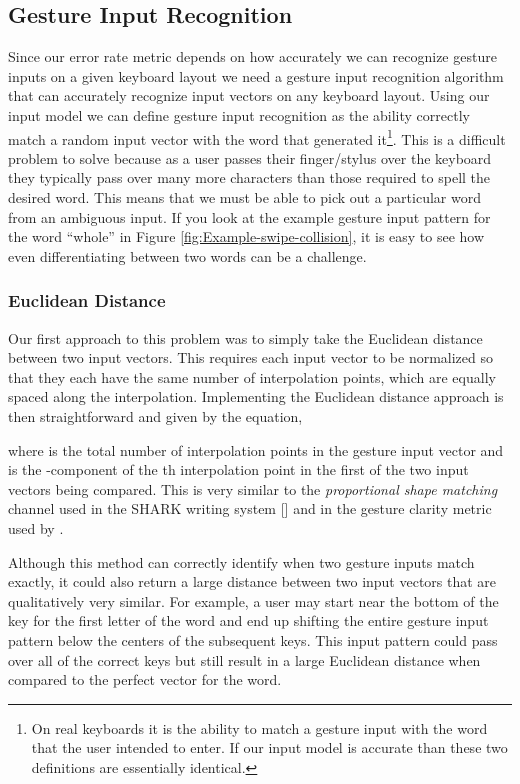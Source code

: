 \documentclass[final,1p,times,authoryear]{elsarticle}
\begin{document}
\subsection{Gesture Input Recognition}\label{sub:Distance-Measure}
Since our error rate metric depends on how accurately we can recognize gesture inputs on a given keyboard layout we need a gesture input recognition algorithm that can accurately recognize input vectors on any keyboard layout.
Using our input model we can define gesture input recognition as the ability correctly match a random input
vector with the word that generated it\footnote{On real keyboards it is the ability to match a gesture input with the word
that the user intended to enter. If our input model is accurate than these two definitions are essentially identical.}.
This is a difficult problem to solve because as a user passes their finger/stylus over the keyboard they typically pass over
many more characters than those required to spell the desired word.
This means that we must be able to pick out a particular word from
an ambiguous input. If you look at the example gesture input pattern for the
word ``whole'' in Figure \ref{fig:Example-swipe-collision}, it
is easy to see how even differentiating between two words can be a
challenge.

\subsubsection{Euclidean Distance}
Our first approach to this problem was to simply take the Euclidean distance between two input vectors. 
This requires each input vector to be normalized so that they each have the same number of interpolation points, which are equally spaced along the interpolation.
Implementing the Euclidean distance approach is then straightforward and given by the equation,


where  is the total number of interpolation points in the gesture input vector and  is the -component of the th interpolation point in the first of the two input vectors being compared. 
This is very similar to the \textit{proportional shape matching} channel used in the SHARK writing system [\cite{SHARK2}] and in the gesture clarity
metric used by \cite{googleKeyboard}. 

Although this method can correctly identify when two gesture inputs match exactly, it could also return a large distance between two input vectors that are qualitatively very similar.
For example, a user may start near the bottom of the key for the first letter of the word and end up shifting the entire gesture input pattern below the centers of the subsequent keys.
This input pattern could pass over all of the correct keys but still result in a large Euclidean distance when compared to the perfect vector for the word. 
\end{document}

